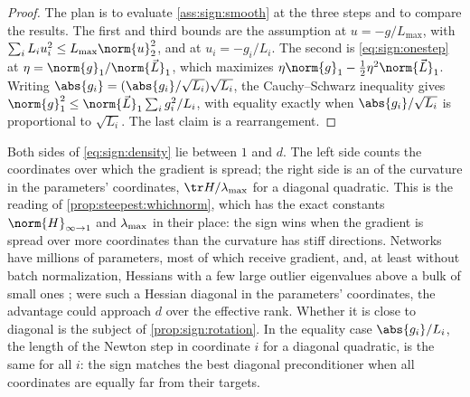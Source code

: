 \begin{refsection}

\begin{proof}
The plan is to evaluate \cref{ass:sign:smooth} at the three steps and to compare the results. The first and third bounds are the assumption at $u=-g/L_{\max}$, with $\sum_iL_iu_i^2\le L_{\max}\norm{u}_2^2$, and at $u_i=-g_i/L_i$. The second is \eqref{eq:sign:onestep} at $\eta=\norm{g}_1/\norm{\vec L}_1$, which maximizes $\eta\norm{g}_1-\frac12\eta^2\norm{\vec L}_1$. Writing $\abs{g_i}=(\abs{g_i}/\sqrt{L_i})\sqrt{L_i}$, the Cauchy--Schwarz inequality gives $\norm{g}_1^2\le\norm{\vec L}_1\sum_ig_i^2/L_i$, with equality exactly when $\abs{g_i}/\sqrt{L_i}$ is proportional to $\sqrt{L_i}$. The last claim is a rearrangement.
\end{proof}

Both sides of \eqref{eq:sign:density} lie between $1$ and $d$. The left side counts the coordinates over which the gradient is spread; the right side is an  of the curvature in the parameters' coordinates, $\tr H/\lmax$ for a diagonal quadratic. This is the reading of \cref{prop:steepest:whichnorm}, which has the exact constants $\norm{H}_{\infty\to1}$ and $\lambda_{\max}$ in their place: the sign wins when the gradient is spread over more coordinates than the curvature has stiff directions. Networks have millions of parameters, most of which receive gradient, and, at least without batch normalization, Hessians with a few large outlier eigenvalues above a bulk of small ones \parencite{GhorbaniKrishnanXiao2019}; were such a Hessian diagonal in the parameters' coordinates, the advantage could approach $d$ over the effective rank. Whether it is close to diagonal is the subject of \cref{prop:sign:rotation}. In the equality case $\abs{g_i}/L_i$, the length of the Newton step in coordinate $i$ for a diagonal quadratic, is the same for all $i$: the sign matches the best diagonal preconditioner when all coordinates are equally far from their targets.


\end{refsection}
